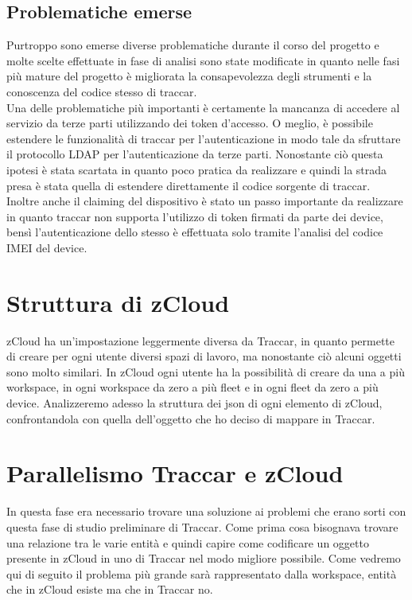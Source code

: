 \documentclass[a4paper,titlepage,12pt]{book}
\begin{document}
\subsection{
\sffamily Problematiche emerse}
Purtroppo sono emerse diverse problematiche durante il corso del progetto e molte scelte effettuate in fase di analisi sono state modificate in quanto nelle fasi più mature del progetto è migliorata la consapevolezza degli strumenti e la conoscenza del codice stesso di traccar. \\
Una delle problematiche più importanti è certamente la mancanza di accedere al servizio da terze parti utilizzando dei token d'accesso. O meglio, è possibile estendere le funzionalità di traccar per l'autenticazione in modo tale da sfruttare il protocollo LDAP per l'autenticazione da terze parti. Nonostante ciò questa ipotesi è stata scartata in quanto poco pratica da realizzare e quindi la strada presa è stata quella di estendere direttamente il codice sorgente di traccar.\\
Inoltre anche il claiming del dispositivo è stato un passo importante da realizzare in quanto traccar non supporta l'utilizzo di token firmati da parte dei device, bensì l'autenticazione dello stesso è effettuata solo tramite l'analisi del codice IMEI del device.

\section{
\sffamily Struttura di zCloud}
zCloud ha un'impostazione leggermente diversa da Traccar, in quanto permette di creare per ogni utente diversi spazi di lavoro, ma nonostante ciò alcuni oggetti sono molto similari. In zCloud ogni utente ha la possibilità di creare da una a più workspace, in ogni workspace da zero a più fleet e in ogni fleet da zero a più device. Analizzeremo adesso la struttura dei json di ogni elemento di zCloud, confrontandola con quella dell'oggetto che ho deciso di mappare in Traccar.


\section{
\sffamily Parallelismo Traccar e zCloud}
In questa fase era necessario trovare una soluzione ai problemi che erano sorti con questa fase di studio preliminare di Traccar. Come prima cosa bisognava trovare una relazione tra le varie entità e quindi capire come codificare un oggetto presente in zCloud in uno di Traccar nel modo migliore possibile. Come vedremo qui di seguito il problema più grande sarà rappresentato dalla workspace, entità che in zCloud esiste ma che in Traccar no.
\end{document}
